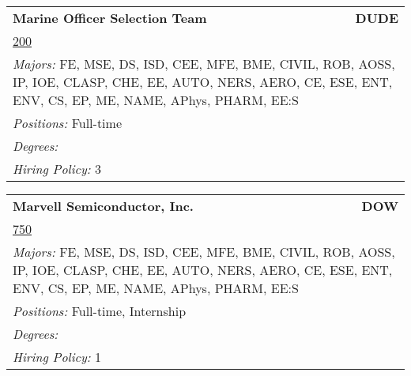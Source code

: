 \documentclass[twoside]{article}
\begin{document}
\begin{center}
\begin{multicols}{3}
\begin{FlushLeft}
\begin{minipage}{\columnwidth}
\end{minipage}
 
\begin{minipage}{\columnwidth}\begin{tabularx}{.95\columnwidth}{Xr}
                 {\Large\bf Marine Officer Selection Team} & {\Large\bf DUDE}\\
    \multicolumn{2}{p{.95\columnwidth}}{\url{200}}\\
    \multicolumn{2}{p{.95\columnwidth}}{\emph{Majors:} FE, MSE, DS, ISD, CEE, MFE, BME, CIVIL, ROB, AOSS, IP, IOE, CLASP, CHE, EE, AUTO, NERS, AERO, CE, ESE, ENT, ENV, CS, EP, ME, NAME, APhys, PHARM, EE:S}\\
    \multicolumn{2}{p{.95\columnwidth}}{\emph{Positions:} Full-time}\\
    \multicolumn{2}{p{.95\columnwidth}}{\emph{Degrees:} }\\
    \multicolumn{2}{p{.95\columnwidth}}{\emph{Hiring Policy:} 3}\\
    \end{tabularx}
    
\end{minipage}
 
\begin{minipage}{\columnwidth}\begin{tabularx}{.95\columnwidth}{Xr}
                 {\Large\bf Marvell Semiconductor, Inc.} & {\Large\bf DOW}\\
    \multicolumn{2}{p{.95\columnwidth}}{\url{750}}\\
    \multicolumn{2}{p{.95\columnwidth}}{\emph{Majors:} FE, MSE, DS, ISD, CEE, MFE, BME, CIVIL, ROB, AOSS, IP, IOE, CLASP, CHE, EE, AUTO, NERS, AERO, CE, ESE, ENT, ENV, CS, EP, ME, NAME, APhys, PHARM, EE:S}\\
    \multicolumn{2}{p{.95\columnwidth}}{\emph{Positions:} Full-time, Internship}\\
    \multicolumn{2}{p{.95\columnwidth}}{\emph{Degrees:} }\\
    \multicolumn{2}{p{.95\columnwidth}}{\emph{Hiring Policy:} 1}\\
    \end{tabularx}
    
\end{minipage}
 

\end{FlushLeft}
\end{multicols}
\end{center}
\end{document}
